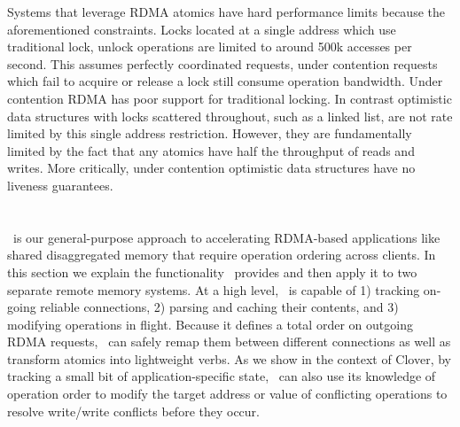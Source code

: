 Systems that leverage RDMA atomics have hard performance
limits because the aforementioned constraints.  Locks
located at a single address which use traditional lock,
unlock operations are limited to around 500k accesses per
second. This assumes perfectly coordinated requests, under
contention requests which fail to acquire or release a lock
still consume operation bandwidth.
Under contention RDMA has poor support for traditional
locking. In contrast optimistic data structures with locks
scattered throughout, such as a linked list, are not rate
limited by this single address restriction.  However, they
are fundamentally limited by the fact that any atomics have
half the throughput of reads and writes. More critically,
under contention optimistic data structures have no liveness
guarantees.





\section{\sword}

\sword\ is our general-purpose approach to accelerating RDMA-based
applications like shared disaggregated memory that require operation
ordering across clients.  In this section we explain the functionality
\sword\ provides and then apply it to two separate remote memory
systems.  At a high level, \sword\ is capable of 1) tracking on-going
reliable connections, 2) parsing and caching their contents, and 3)
modifying operations in flight.  Because it defines a total order on
outgoing RDMA requests, \sword\ can safely remap them between
different connections as well as transform atomics into lightweight
verbs.  As we show in the context of Clover, by tracking a small bit
of application-specific state, \sword\ can also use its knowledge of
operation order to modify the target address or value of conflicting
operations to resolve write/write conflicts before they occur.


